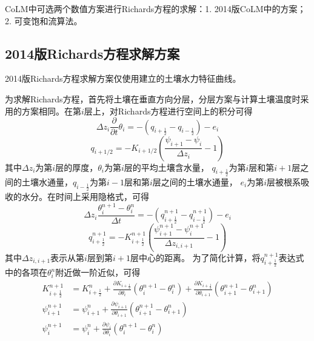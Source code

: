 CoLM中可选两个数值方案进行Richards方程的求解：1. 2014版CoLM中的方案；2. 可变饱和流算法。

\subsection{2014版Richards方程求解方案}

2014版Richards方程求解方案仅使用\citet{campbell1974}建立的土壤水力特征曲线。

为求解Richards方程，首先将土壤在垂直方向分层，分层方案与计算土壤温度时采用的方案相同。在第$i$层上，对Richards方程进行空间上的积分可得
\begin{equation}
\Delta z_{i} \frac{\partial}{\partial t} \theta_{i}=-\left(q_{i+\frac{1}{2}}-q_{i-\frac{1}{2}}\right)-e_{i}
\end{equation}
\begin{equation}
q_{i+1 / 2}=-K_{i+1 / 2}\left(\frac{\psi_{i+1}-\psi_{i}}{\Delta z_{i}}-1\right)
\end{equation}
其中$\Delta {z_i}$为第$i$层的厚度，$\theta_i$为第$i$层的平均土壤含水量，
$q_{i+\frac{1}{2}}$为第$i$层和第$i+1$层之间的土壤水通量，$q_{i-\frac{1}{2}}$为第$i-1$层和第$i$层之间的土壤水通量，
$e_i$为第$i$层被根系吸收的水分。在时间上采用隐格式，可得
\begin{equation}
\Delta z_{i} \frac{\theta_{i}^{n+1}-\theta_{i}^{n}}{\Delta t}=-\left(q_{i+\frac{1}{2}}^{n+1}-q_{i-\frac{1}{2}}^{n+1}\right)-e_{i}
\end{equation}
\begin{equation}
q_{i+\frac{1}{2}}^{n+1}=-K_{i+\frac{1}{2}}^{n+1}\left(\frac{\psi_{i+1}^{n+1}-\psi_{i}^{n+1}}{\Delta z_{i, i+1}}-1\right)
\end{equation}
其中$\Delta z_{i,i+1}$表示从第$i$层到第$i+1$层中心的距离。
为了简化计算，将$q_{i+\frac{1}{2}}^{n+1}$表达式中的各项在$\theta_i^n$附近做一阶近似，可得
\begin{equation}
\begin{aligned}
K_{i+\frac{1}{2}}^{n+1} &= K_{i+\frac{1}{2}}^{n}+\frac{\partial K_{i+\frac{1}{2}}}
    {\partial \theta_{i}}\left(\theta_{i}^{n+1}-\theta_{i}^{n}\right)+\frac{\partial K_{i+\frac{1}{2}}}
    {\partial \theta_{i+1}}\left(\theta_{i+1}^{n+1}-\theta_{i+1}^{n}\right) \\ 
\psi_{i+1}^{n+1} &= \psi_{i+1}^{n}+\frac{\partial \psi_{i+1}}{\partial \theta_{i+1}}\left(\theta_{i+1}^{n+1}-\theta_{i+1}^{n}\right) \\
\psi_{i}^{n+1} &= \psi_{i}^{n}+\frac{\partial \psi_{i}}{\partial \theta_{i}}\left(\theta_{i}^{n+1}-\theta_{i}^{n}\right)
\end{aligned}
\end{equation}

